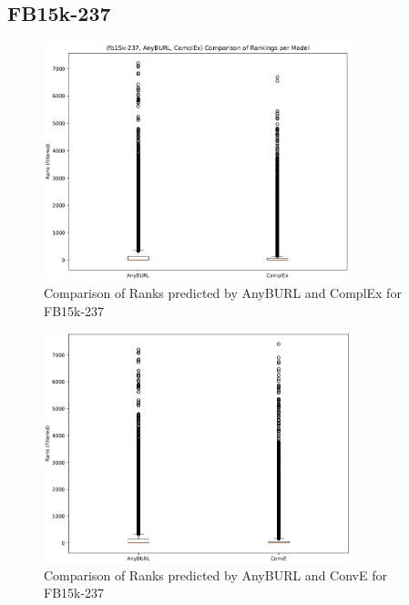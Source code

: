 \subsection{FB15k-237}

\begin{figure}[H]
\centering
\includegraphics[width=0.8\textwidth]{images/ranks_anyburl_complex_fb15k.png}
\caption{Comparison of Ranks predicted by AnyBURL and ComplEx for FB15k-237}
\label{fig:ranks_anyburl_complex_fb15k}
\end{figure}

\begin{figure}[H]
\centering
\includegraphics[width=0.8\textwidth]{images/ranks_anyburl_conve_fb15k.png}
\caption{Comparison of Ranks predicted by AnyBURL and ConvE for FB15k-237}
\label{fig:ranks_anyburl_conve_fb15k}
\end{figure}

